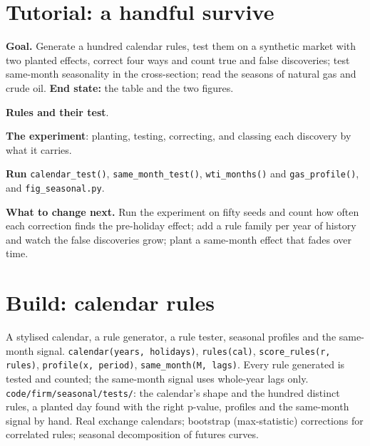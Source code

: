 \section{Tutorial: a handful survive}\label{tut:s1:seasonality-and-calendar-effects:tut}

\begin{tutorial}
\textbf{Goal.} Generate a hundred calendar rules, test them on a synthetic market with two planted effects, correct four ways and count true and false
discoveries; test same-month seasonality in the cross-section; read the seasons of natural gas and crude oil. \textbf{End state:} the table and the two
figures.
\begin{tutsteps}
\item \textbf{Rules and their test}.
\label{lst:s1:seasonality-and-calendar-effects:rules}
\item \textbf{The experiment}: planting, testing, correcting, and classing each discovery by what it carries.
\label{lst:s1:seasonality-and-calendar-effects:experiment}
\item \textbf{Run} \texttt{calendar\_test()}, \texttt{same\_month\_test()}, \texttt{wti\_months()} and \texttt{gas\_profile()}, and \texttt{fig\_seasonal.py}.
\end{tutsteps}
\textbf{What to change next.} Run the experiment on fifty seeds and count how often each correction finds the pre-holiday effect; add a rule family per
year of history and watch the false discoveries grow; plant a same-month effect that fades over time.
\end{tutorial}

\section{Build: calendar rules}\label{bld:s1:seasonality-and-calendar-effects:seasonal}

\begin{build}
 A stylised calendar, a rule generator, a rule tester, seasonal profiles and the same-month signal.
 \texttt{calendar(years, holidays)}, \texttt{rules(cal)}, \texttt{score\_rules(r, rules)}, \texttt{profile(x, period)},
\texttt{same\_month(M, lags)}.
 Every rule generated is tested and counted; the same-month signal uses whole-year lags only.
 \texttt{code/firm/seasonal/tests/}: the calendar's shape and the hundred distinct rules, a planted day found with the right
p-value, profiles and the same-month signal by hand.
 Real exchange calendars; bootstrap (max-statistic) corrections for correlated rules; seasonal decomposition of futures curves.
\end{build}

